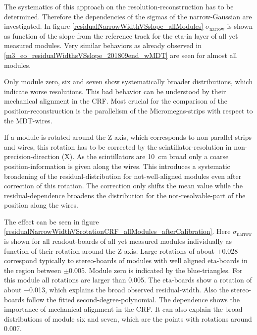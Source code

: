 \documentclass[
twoside,            %
BCOR1.4cm,          %
10pt,               %
headings=normal,    %
headsepline,        %
clearplainpage,		%
final,              %
div=14,
open=right,
bibliography=toc
]{scrreprt}
\begin{document}
The systematics of this approach on the resolution-reconstruction has to be determined.
Therefore the dependencies of the sigmas of the narrow-Gaussian are investigated.
In figure \ref{residualNarrowWidthVSslope_allModules} $\sigma_{\mathrm{narrow}}$ is shown as function of the slope from the reference track for the eta-in layer of all yet measured modules.
Very similar behaviors as already observed in \ref{m3_eo_residualWidthsVSslope_201809end_wMDT} are seen for almost all modules.

Only module zero, six and seven show systematically broader distributions, which indicate worse resolutions.
This bad behavior can be understood by their mechanical alignment in the CRF.
Most crucial for the comparison of the position-reconstruction is the parallelism of the Micromegas-strips with respect to the MDT-wires.

If a module is rotated around the Z-axis, which corresponds to non parallel strips and wires, this rotation has to be corrected by the scintillator-resolution in non-precision-direction (X).
As the scintillators are \SI{10}{cm} broad only a coarse position-information is given along the wires.
This introduces a systematic broadening of the residual-distribution for not-well-aligned modules even after correction of this rotation.
The correction only shifts the mean value while the residual-dependence broadens the distribution for the not-resolvable-part of the position along the wires.

The effect can be seen in figure \ref{residualNarrowWidthVSrotationCRF_allModules_afterCalibration}.
Here $\sigma_{\mathrm{narrow}}$ is shown for all readout-boards of all yet measured modules individually as function of their rotation around the Z-axis.
Large rotations of about $\pm$0.028 correspond typically to stereo-boards of modules with well aligned eta-boards in the region between $\pm$0.005.
Module zero is indicated by the blue-triangles.
For this module all rotations are larger than 0.005.
The eta-boards show a rotation of about $-$0.013, which explains the broad observed residual-width.
Also the stereo-boards follow the fitted second-degree-polynomial.
The dependence shows the importance of mechanical alignment in the CRF.
It can also explain the broad distributions of module six and seven, which are the points with rotations around 0.007.
\end{document}
